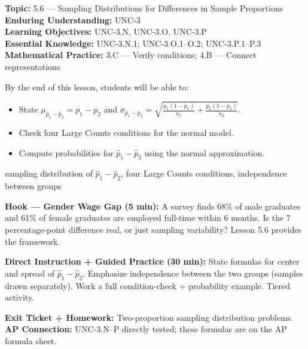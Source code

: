 \documentclass[10pt]{article}
\begin{document}

\begin{objectivebox}
\textbf{Topic:} 5.6 — Sampling Distributions for Differences in Sample Proportions\\
\textbf{Enduring Understanding:} UNC-3\\
\textbf{Learning Objectives:} UNC-3.N, UNC-3.O, UNC-3.P\\
\textbf{Essential Knowledge:} UNC-3.N.1; UNC-3.O.1--O.2; UNC-3.P.1--P.3\\
\textbf{Mathematical Practice:} 3.C — Verify conditions; 4.B — Connect representations
\end{objectivebox}

\begin{learningtargetbox}
By the end of this lesson, students will be able to:
\begin{itemize}
  \item State $\mu_{\hat{p}_1 - \hat{p}_2} = p_1 - p_2$ and $\sigma_{\hat{p}_1 - \hat{p}_2} = \sqrt{\frac{p_1(1-p_1)}{n_1} + \frac{p_2(1-p_2)}{n_2}}$.
  \item Check four Large Counts conditions for the normal model.
  \item Compute probabilities for $\hat{p}_1 - \hat{p}_2$ using the normal approximation.
\end{itemize}
\end{learningtargetbox}

\begin{vocabbox}
sampling distribution of $\hat{p}_1 - \hat{p}_2$, four Large Counts conditions, independence between groups
\end{vocabbox}

\begin{hookbox}
\textbf{Hook — Gender Wage Gap (5 min):} A survey finds 68\% of male graduates and 61\% of female graduates are employed full-time within 6 months. Is the 7 percentage-point difference real, or just sampling variability? Lesson 5.6 provides the framework.
\end{hookbox}

\begin{notesbox}
\textbf{Direct Instruction + Guided Practice (30 min):} State formulas for center and spread of $\hat{p}_1 - \hat{p}_2$. Emphasize independence between the two groups (samples drawn separately). Work a full condition-check + probability example. Tiered activity.
\end{notesbox}

\begin{reflectionbox}
\textbf{Exit Ticket + Homework:} Two-proportion sampling distribution problems.\\
\textbf{AP Connection:} UNC-3.N--P directly tested; these formulas are on the AP formula sheet.
\end{reflectionbox}
\end{document}
